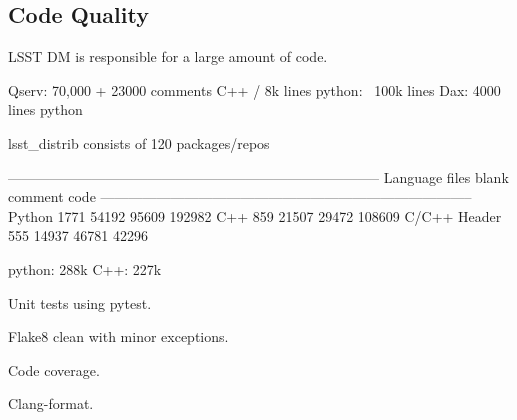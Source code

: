 \subsection{Code Quality}

LSST DM is responsible for a large amount of code.

Qserv: 70,000 + 23000 comments C++ / 8k lines python: ~100k lines
Dax: 4000 lines python


lsst\_distrib consists of 120 packages/repos

--------------------------------------------------------------------------------
Language                      files          blank        comment           code
--------------------------------------------------------------------------------
Python                         1771          54192          95609         192982
C++                             859          21507          29472         108609
C/C++ Header                    555          14937          46781          42296




python: 288k
C++: 227k

Unit tests using pytest.

Flake8 clean with minor exceptions.\label{sec:flake8}

Code coverage.

Clang-format.
